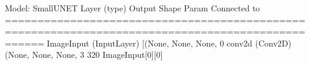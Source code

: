 \documentclass[letterpaper,10pt,english]{sphinxmanual}
\begin{document}
\begin{sphinxVerbatim}[commandchars=\\\{\}]
Model: \PYGZdq{}SmallUNET\PYGZdq{}
\PYGZus{}\PYGZus{}\PYGZus{}\PYGZus{}\PYGZus{}\PYGZus{}\PYGZus{}\PYGZus{}\PYGZus{}\PYGZus{}\PYGZus{}\PYGZus{}\PYGZus{}\PYGZus{}\PYGZus{}\PYGZus{}\PYGZus{}\PYGZus{}\PYGZus{}\PYGZus{}\PYGZus{}\PYGZus{}\PYGZus{}\PYGZus{}\PYGZus{}\PYGZus{}\PYGZus{}\PYGZus{}\PYGZus{}\PYGZus{}\PYGZus{}\PYGZus{}\PYGZus{}\PYGZus{}\PYGZus{}\PYGZus{}\PYGZus{}\PYGZus{}\PYGZus{}\PYGZus{}\PYGZus{}\PYGZus{}\PYGZus{}\PYGZus{}\PYGZus{}\PYGZus{}\PYGZus{}\PYGZus{}\PYGZus{}\PYGZus{}\PYGZus{}\PYGZus{}\PYGZus{}\PYGZus{}\PYGZus{}\PYGZus{}\PYGZus{}\PYGZus{}\PYGZus{}\PYGZus{}\PYGZus{}\PYGZus{}\PYGZus{}\PYGZus{}\PYGZus{}\PYGZus{}\PYGZus{}\PYGZus{}\PYGZus{}\PYGZus{}\PYGZus{}\PYGZus{}\PYGZus{}\PYGZus{}\PYGZus{}\PYGZus{}\PYGZus{}\PYGZus{}\PYGZus{}\PYGZus{}\PYGZus{}\PYGZus{}\PYGZus{}\PYGZus{}\PYGZus{}\PYGZus{}\PYGZus{}\PYGZus{}\PYGZus{}\PYGZus{}\PYGZus{}\PYGZus{}\PYGZus{}\PYGZus{}\PYGZus{}\PYGZus{}\PYGZus{}\PYGZus{}
Layer (type)                    Output Shape         Param \PYGZsh{}     Connected to                     
==================================================================================================
Image\PYGZus{}Input (InputLayer)        [(None, None, None,  0                                            
\PYGZus{}\PYGZus{}\PYGZus{}\PYGZus{}\PYGZus{}\PYGZus{}\PYGZus{}\PYGZus{}\PYGZus{}\PYGZus{}\PYGZus{}\PYGZus{}\PYGZus{}\PYGZus{}\PYGZus{}\PYGZus{}\PYGZus{}\PYGZus{}\PYGZus{}\PYGZus{}\PYGZus{}\PYGZus{}\PYGZus{}\PYGZus{}\PYGZus{}\PYGZus{}\PYGZus{}\PYGZus{}\PYGZus{}\PYGZus{}\PYGZus{}\PYGZus{}\PYGZus{}\PYGZus{}\PYGZus{}\PYGZus{}\PYGZus{}\PYGZus{}\PYGZus{}\PYGZus{}\PYGZus{}\PYGZus{}\PYGZus{}\PYGZus{}\PYGZus{}\PYGZus{}\PYGZus{}\PYGZus{}\PYGZus{}\PYGZus{}\PYGZus{}\PYGZus{}\PYGZus{}\PYGZus{}\PYGZus{}\PYGZus{}\PYGZus{}\PYGZus{}\PYGZus{}\PYGZus{}\PYGZus{}\PYGZus{}\PYGZus{}\PYGZus{}\PYGZus{}\PYGZus{}\PYGZus{}\PYGZus{}\PYGZus{}\PYGZus{}\PYGZus{}\PYGZus{}\PYGZus{}\PYGZus{}\PYGZus{}\PYGZus{}\PYGZus{}\PYGZus{}\PYGZus{}\PYGZus{}\PYGZus{}\PYGZus{}\PYGZus{}\PYGZus{}\PYGZus{}\PYGZus{}\PYGZus{}\PYGZus{}\PYGZus{}\PYGZus{}\PYGZus{}\PYGZus{}\PYGZus{}\PYGZus{}\PYGZus{}\PYGZus{}\PYGZus{}\PYGZus{}
conv2d (Conv2D)                 (None, None, None, 3 320         Image\PYGZus{}Input[0][0]                
\PYGZus{}\PYGZus{}\PYGZus{}\PYGZus{}\PYGZus{}\PYGZus{}\PYGZus{}\PYGZus{}\PYGZus{}\PYGZus{}\PYGZus{}\PYGZus{}\PYGZus{}\PYGZus{}\PYGZus{}\PYGZus{}\PYGZus{}\PYGZus{}\PYGZus{}\PYGZus{}\PYGZus{}\PYGZus{}\PYGZus{}\PYGZus{}\PYGZus{}\PYGZus{}\PYGZus{}\PYGZus{}\PYGZus{}\PYGZus{}\PYGZus{}\PYGZus{}\PYGZus{}\PYGZus{}\PYGZus{}\PYGZus{}\PYGZus{}\PYGZus{}\PYGZus{}\PYGZus{}\PYGZus{}\PYGZus{}\PYGZus{}\PYGZus{}\PYGZus{}\PYGZus{}\PYGZus{}\PYGZus{}\PYGZus{}\PYGZus{}\PYGZus{}\PYGZus{}\PYGZus{}\PYGZus{}\PYGZus{}\PYGZus{}\PYGZus{}\PYGZus{}\PYGZus{}\PYGZus{}\PYGZus{}\PYGZus{}\PYGZus{}\PYGZus{}\PYGZus{}\PYGZus{}\PYGZus{}\PYGZus{}\PYGZus{}\PYGZus{}\PYGZus{}\PYGZus{}\PYGZus{}\PYGZus{}\PYGZus{}\PYGZus{}\PYGZus{}\PYGZus{}\PYGZus{}\PYGZus{}\PYGZus{}\PYGZus{}\PYGZus{}\PYGZus{}\PYGZus{}\PYGZus{}\PYGZus{}\PYGZus{}\PYGZus{}\PYGZus{}\PYGZus{}\PYGZus{}\PYGZus{}\PYGZus{}\PYGZus{}\PYGZus{}\PYGZus{}\PYGZus{}

\end{sphinxVerbatim}
\end{document}
